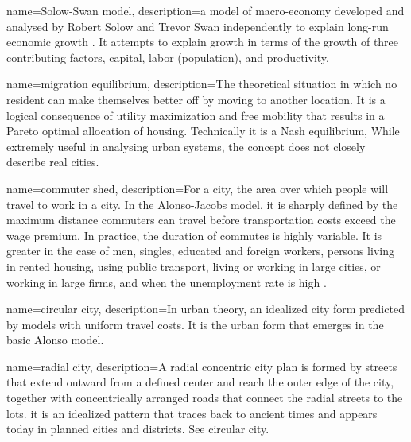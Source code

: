 {
name=Solow-Swan model,
description={a  model of macro-economy developed and analysed by Robert Solow and Trevor Swan independently to explain long-run economic growth \cite{dimandTrevorSwanNeoclassical2009}. It attempts to explain  growth in terms of the growth of three contributing factors, capital, labor (population),  and  productivity.}
}

{
name=migration equilibrium,
description={The theoretical situation in which no resident can  make themselves better off by moving to another location. It is a logical consequence of utility maximization and free mobility that results in a Pareto optimal allocation of housing. Technically it is a Nash equilibrium, While extremely useful in analysing urban systems, the concept does not closely describe real cities.
}
}

{
name=commuter shed,
description={For a city, the area over which people will travel to work in a city. In the \gls{Alonso-Jacobs model}, it is sharply defined by the maximum distance commuters can travel before transportation costs exceed the wage premium. In  practice, the duration of commutes is highly variable. It is greater in the case of men, singles, educated and foreign workers, persons living in rented housing, using public transport, living or working in large cities, or working in large firms,  and when the  unemployment rate is high\cite{axisaFactorsInfluencingCommute2012} .}
}

{
name=circular city,
description={In urban theory, an idealized city form predicted by models with uniform travel costs. It is the urban form that emerges in the basic \gls{Alonso model}. %
}
}

{
name=radial city,
description={A radial concentric city plan is formed by streets that extend outward from a defined center and reach the outer edge of the city, together with concentrically arranged roads that connect the radial streets to the lots. it is an idealized pattern that traces back to ancient times and appears  today in planned cities and districts. See \gls{circular city}.}
}

